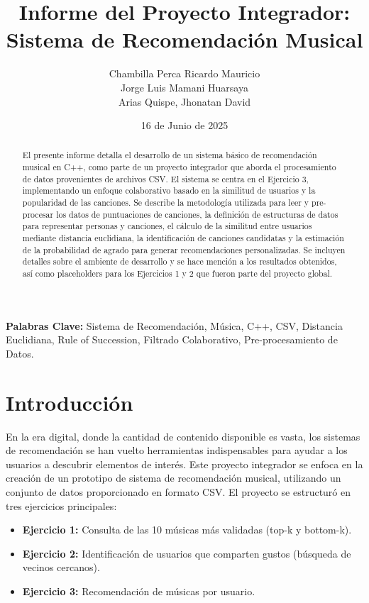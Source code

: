 \documentclass{article}
\title{Informe del Proyecto Integrador: Sistema de Recomendación Musical}
\author{%
    Chambilla Perca Ricardo Mauricio \\
    Jorge Luis Mamani Huarsaya \\
    Arias Quispe, Jhonatan David
}
\date{16 de Junio de 2025} %
\newcommand{\keywords}[1]{\textbf{Palabras Clave:} #1}
\begin{document}
\maketitle %

\begin{abstract}
El presente informe detalla el desarrollo de un sistema básico de recomendación musical en C++, como parte de un proyecto integrador que aborda el procesamiento de datos provenientes de archivos CSV. El sistema se centra en el Ejercicio 3, implementando un enfoque colaborativo basado en la similitud de usuarios y la popularidad de las canciones. Se describe la metodología utilizada para leer y pre-procesar los datos de puntuaciones de canciones, la definición de estructuras de datos para representar personas y canciones, el cálculo de la similitud entre usuarios mediante distancia euclidiana, la identificación de canciones candidatas y la estimación de la probabilidad de agrado para generar recomendaciones personalizadas. Se incluyen detalles sobre el ambiente de desarrollo y se hace mención a los resultados obtenidos, así como placeholders para los Ejercicios 1 y 2 que fueron parte del proyecto global.
\end{abstract}

\keywords{Sistema de Recomendación, Música, C++, CSV, Distancia Euclidiana, Rule of Succession, Filtrado Colaborativo, Pre-procesamiento de Datos.}

\section{Introducción}

En la era digital, donde la cantidad de contenido disponible es vasta, los sistemas de recomendación se han vuelto herramientas indispensables para ayudar a los usuarios a descubrir elementos de interés. Este proyecto integrador se enfoca en la creación de un prototipo de sistema de recomendación musical, utilizando un conjunto de datos proporcionado en formato CSV. El proyecto se estructuró en tres ejercicios principales:

\begin{itemize}
    \item \textbf{Ejercicio 1:} Consulta de las 10 músicas más validadas (top-k y bottom-k).
    \item \textbf{Ejercicio 2:} Identificación de usuarios que comparten gustos (búsqueda de vecinos cercanos).
    \item \textbf{Ejercicio 3:} Recomendación de músicas por usuario.
\end{itemize}
\end{document}
